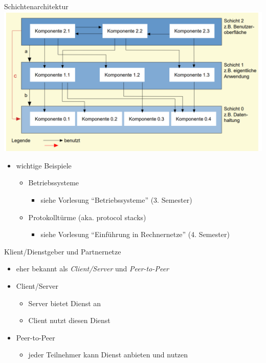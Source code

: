 \documentclass[18pt]{beamer}
\begin{document}
\begin{frame}{Schichtenarchitektur}
	\centering \includegraphics[scale=0.3]{pics/tut3/layers.png}
	\begin{itemize}
		\item wichtige Beispiele
		\begin{itemize}
			\item Betriebssysteme
			\begin{itemize}
				\item siehe Vorlesung \enquote{Betriebssysteme} (3. Semester)
			\end{itemize}
			\item Protokolltürme (aka. protocol stacks) 
			\begin{itemize}
				\item siehe Vorlesung \enquote{Einführung in Rechnernetze} (4. Semester)
			\end{itemize}
		\end{itemize}
	\end{itemize}
\end{frame}

\begin{frame}{Klient/Dienstgeber und Partnernetze}
	\begin{itemize}
		\item eher bekannt als \emph{Client/Server} und \emph{Peer-to-Peer}
		\item Client/Server
		\begin{itemize}
			\item Server bietet Dienst an
			\item Client nutzt diesen Dienst
		\end{itemize}
		\item Peer-to-Peer
		\begin{itemize}
			\item jeder Teilnehmer kann Dienst anbieten und nutzen
		\end{itemize}
	\end{itemize}
\end{frame}
\end{document}
